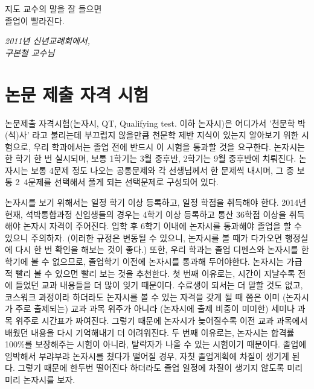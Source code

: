 \epigraph{지도 교수의 말을 잘 들으면\\
          졸업이 빨라진다.}
 {\textit{2011년 신년교례회에서,\\ \textsc{구본철 교수님}}}

\section{논문 제출 자격 시험}
논문제출 자격시험(논자시, QT, Qualifying test. 이하 논자시)은 어디가서 '천문학
박(석)사' 라고 불리는데 부끄럽지 않을만큼 천문학 제반 지식이 있는지 알아보기 위한
시험으로, 우리 학과에서는 졸업 전에 반드시 이 시험을 통과할 것을 요구한다.
논자시는 한 학기 한 번 실시되며, 보통 1학기는 3월 중후반, 2학기는 9월 중후반에
치뤄진다. 논자시는 보통 4문제 정도 나오는 공통문제와 각 선생님께서 한 문제씩
내시며, 그 중 보통 2~4문제를 선택해서 풀게 되는 선택문제로 구성되어 있다.

논자시를 보기 위해서는 일정 학기 이상 등록하고, 일정 학점을 취득해야 한다. 2014년
현재, 석박통합과정 신입생들의 경우는 4학기 이상 등록하고 통산 36학점 이상을
취득해야 논자시 자격이 주어진다. 입학 후 6학기 이내에 논자시를 통과해야 졸업을 할
수 있으니 주의하자. (이러한 규정은 변동될 수 있으니, 논자시를 볼 때가 다가오면
행정실에 다시 한 번 확인을 해보는 것이 좋다.)  또한, 우리 학과는 졸업 디펜스와
논자시를 한 학기에 볼 수 없으므로, 졸업학기 이전에 논자시를 통과해
두어야한다. 논자시는 가급적 빨리 볼 수 있으면 빨리 보는 것을 추천한다. 첫 번째
이유로는, 시간이 지날수록 전에 들었던 교과 내용들을 더 많이 잊기
때문이다. 수료생이 되서는 더 말할 것도 없고, 코스워크 과정이라 하더라도 논자시를
볼 수 있는 자격을 갖게 될 때 쯤은 이미 (논자시가 주로 출제되는) 교과 과목 위주가
아니라 (논자시에 출제 비중이 미미한) 세미나 과목 위주로 시간표가 짜여진다. 그렇기
때문에 논자시가 늦어질수록 이전 교과 과목에서 배웠던 내용을 다시 기억해내기 더
어려워진다. 두 번째 이유로는, 논자시는 합격률 100\%를 보장해주는 시험이 아니라,
탈락자가 나올 수 있는 시험이기 때문이다. 졸업에 임박해서 부랴부랴 논자시를 쳤다가
떨어질 경우, 자칫 졸업계획에 차질이 생기게 된다. 그렇기 때문에 한두번 떨어진다
하더라도 졸업 일정에 차질이 생기지 않도록 미리미리 논자시를 보자.

